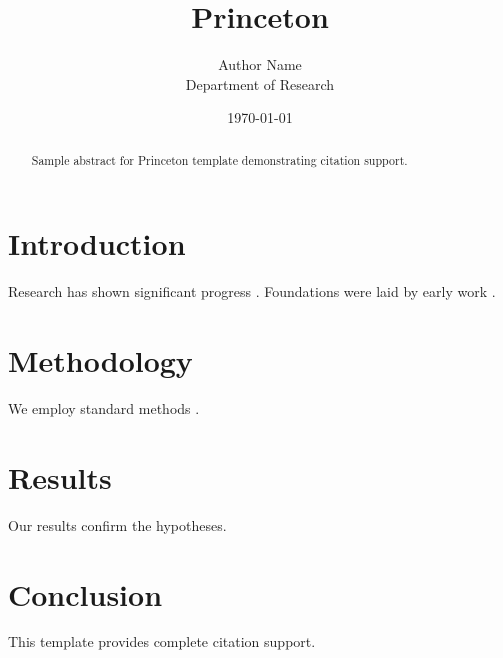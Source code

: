 \documentclass{thesis_princeton}
\title{Princeton}
\author{Author Name \\ \small Department of Research}
\date{\today}
\begin{document}
\maketitle

\begin{abstract}
Sample abstract for Princeton template demonstrating citation support.
\end{abstract}

\section{Introduction}
Research has shown significant progress \citep{einstein1905}. Foundations were laid by early work \citep{turing1950}.

\section{Methodology}
We employ standard methods \citep{knuth1984}.

\section{Results}
Our results confirm the hypotheses.

\section{Conclusion}
This template provides complete citation support.



\end{document}
